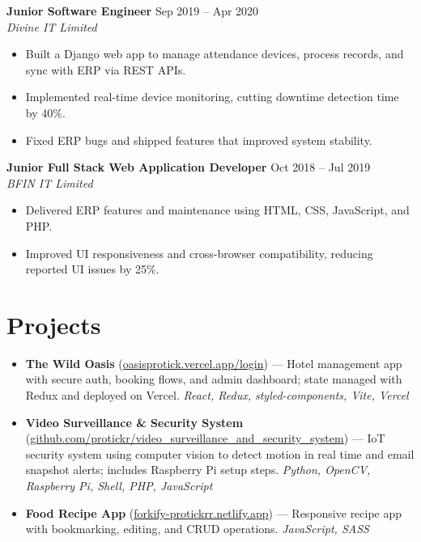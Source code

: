 \documentclass[a4paper,10pt]{article}
\begin{document}
\textbf{Junior Software Engineer} \hfill Sep 2019 -- Apr 2020\\[-2pt]
\textit{Divine IT Limited}\\[-4pt]
\begin{itemize}
  \item Built a Django web app to manage attendance devices, process records, and sync with ERP via REST APIs.
  \item Implemented real-time device monitoring, cutting downtime detection time by 40\%.
  \item Fixed ERP bugs and shipped features that improved system stability.
\end{itemize}

\textbf{Junior Full Stack Web Application Developer} \hfill Oct 2018 -- Jul 2019\\[-2pt]
\textit{BFIN IT Limited}\\[-4pt]
\begin{itemize}
  \item Delivered ERP features and maintenance using HTML, CSS, JavaScript, and PHP.
  \item Improved UI responsiveness and cross-browser compatibility, reducing reported UI issues by 25\%.
\end{itemize}

\section*{Projects}
\begin{itemize}
  \item \textbf{The Wild Oasis} (\href{https://oasisprotick.vercel.app/login}{oasisprotick.vercel.app/login}) --- Hotel management app with secure auth, booking flows, and admin dashboard; state managed with Redux and deployed on Vercel. \emph{React, Redux, styled-components, Vite, Vercel}
  \item \textbf{Video Surveillance \& Security System} (\href{https://github.com/protickr/video_surveillance_and_security_system}{github.com/protickr/video\_surveillance\_and\_security\_system}) --- IoT security system using computer vision to detect motion in real time and email snapshot alerts; includes Raspberry Pi setup steps. \emph{Python, OpenCV, Raspberry Pi, Shell, PHP, JavaScript}
  \item \textbf{Food Recipe App} (\href{https://forkify-protickrr.netlify.app}{forkify-protickrr.netlify.app}) --- Responsive recipe app with bookmarking, editing, and CRUD operations. \emph{JavaScript, SASS}
\end{itemize}
\end{document}

